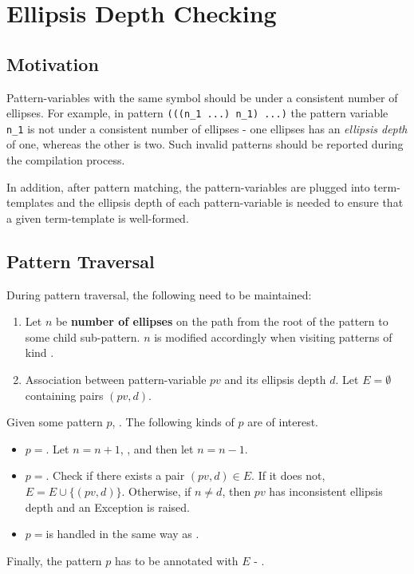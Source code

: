 \section{Ellipsis Depth Checking}

\subsection{Motivation}

Pattern-variables with the same symbol should be under a consistent number of ellipses. For example, in pattern \texttt{(((n\_1 ...)\ n\_1)\ ...)} the pattern variable \texttt{n\_1} is not under a consistent number of ellipses - one ellipses has an \textit{ellipsis depth} of one, whereas the other is two. Such invalid patterns should be reported during the compilation process.

In addition, after pattern matching, the pattern-variables are plugged into term-templates and the ellipsis depth of each pattern-variable is needed to ensure that a given term-template is well-formed.

\subsection{Pattern Traversal}

During pattern traversal, the following need to be maintained:

\begin{enumerate}
\item
Let $n$ be \textbf{number of ellipses} on the path from the root of the pattern to some child sub-pattern. $n$ is modified accordingly when visiting patterns of kind \RepeatNoArg.

\item Association between pattern-variable $pv$ and its ellipsis depth $d$. Let $E=\emptyset$ containing pairs $(pv, d)$.
\end{enumerate}

Given some pattern $p$, . The following kinds of $p$ are of interest.
\begin{itemize}
\item $p=$\space \PatternRepeat. Let $n=n+1$, , and then let $n=n-1$.
\item $p=$\space \BuiltInPattern. Check if there exists a pair $(pv, d) \in E$. If it does not, $E = E \cup \{ (pv, d) \}$. Otherwise, if $n \neq d$, then $pv$ has inconsistent ellipsis depth and an Exception is raised.
\item $p=$\space \NonTerminal \space is handled in the same way as \BuiltInPatternNoArg.
\end{itemize}

Finally, the pattern $p$ has to be annotated with $E$ - .
